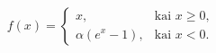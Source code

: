\begin{equation}
f(x) =
\begin{cases}
x, & \text{kai } x \geq 0, \\
\alpha \left(e^{x} - 1\right), & \text{kai } x < 0.
\end{cases}
\label{eq:ELU}
\end{equation}